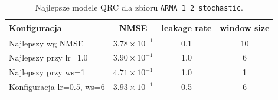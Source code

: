 \begin{table}[ht]
\centering
\caption{Najlepsze modele QRC dla zbioru \texttt{ARMA\_1\_2\_stochastic}.}
\label{tab:qrc-arma_1_2_stochastic}
\begin{tabular}{lccc}
\toprule
Konfiguracja & NMSE & leakage rate & window size \\
\midrule
Najlepszy wg NMSE & $3.78 \times 10^{-1}$ & 0.1 & 10 \\
Najlepszy przy lr=1.0 & $3.90 \times 10^{-1}$ & 1.0 & 6 \\
Najlepszy przy ws=1 & $4.71 \times 10^{-1}$ & 1.0 & 1 \\
Konfiguracja lr=0.5, ws=6 & $3.93 \times 10^{-1}$ & 0.5 & 6 \\
\bottomrule
\end{tabular}
\end{table}